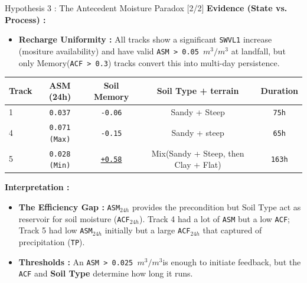 \documentclass[8pt, aspectratio=169]{beamer}
\begin{document}
\begin{frame}{Hypothesis 3 : The Antecedent Moisture Paradox [2/2]}
    \footnotesize
    \textbf{Evidence (State vs. Process) :}
    \begin{itemize}
        \item \textbf{Recharge Uniformity :} All tracks show a significant \texttt{SWVL1} increase (mositure availability) and have valid \texttt{ASM > 0.05 $m^3/m^3$} at landfall, but only Memory(\texttt{ACF > 0.3}) tracks convert this into multi-day persistence.
    \end{itemize}

    \vspace{0.1cm}
    \begin{center}
    \begin{tabular}{lcccc}
        \toprule
        \textbf{Track} & \textbf{ASM (24h)} & \textbf{Soil Memory} & \textbf{Soil Type + terrain} & \textbf{Duration} \\
        \midrule
        1 & \texttt{0.037} & \texttt{-0.06} & Sandy + Steep & \texttt{75h} \\
        4 & \texttt{0.071 (Max)} & \texttt{-0.15} & Sandy + steep & \texttt{65h} \\
        5 & \texttt{0.028 (Min)} & \underline{\texttt{+0.58}} & Mix(Sandy + Steep, then Clay + Flat) & \texttt{163h} \\
        \bottomrule
    \end{tabular}
    \end{center}

    \vspace{0.1cm}
    \footnotesize
    \textbf{Interpretation :}
    \begin{itemize}
        \item \textbf{The Efficiency Gap :} \texttt{ASM$_{24h}$} provides the precondition but Soil Type act as reservoir for soil moisture (\texttt{ACF$_{24h}$}). Track 4 had a lot of \texttt{ASM} but a low \texttt{ACF}; Track 5 had low \texttt{ASM$_{24h}$} initially but a large \texttt{ACF$_{24h}$} that captured of precipitation (\texttt{TP}).
        \item \textbf{Thresholds :} An \texttt{ASM > 0.025 $m^3/m^3$}\footnotemark[7] is enough to initiate feedback, but the \texttt{ACF} and \textbf{Soil Type} determine how long it runs.
    \end{itemize}

    \vfill
\end{frame}
\end{document}
